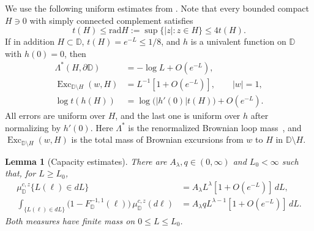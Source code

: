 \documentclass[11pt]{article}
\numberwithin{equation}{section}
\newcommand{\D}{\mathbb{D}}
\newcommand{\1}{\mathbf{1}}
\newtheorem{lemma}[theorem]{Lemma}
\newcommand{\rad}{\mathrm{rad}}
\begin{document}
We use the following uniform estimates from
\cite[Remark~2.8, Lemmas~2.10 and~2.12, and Proposition~3.3]{lawler-field-reversed}.  Note that every bounded compact \(H\ni0\) with simply connected complement satisfies
\begin{equation}\label{eq:one-arm-FL-radius}
 t(H)\le\rad H:=\sup\{|z|:z\in H\}\le4t(H).
\end{equation}
If in addition \(H\subset\D\), \(t(H)=e^{-L}\le1/8\), and \(h\) is a
univalent function on \(\D\) with \(h(0)=0\), then
\begin{align}
 \Lambda^*(H,\partial\D)&=-\log L+O(e^{-L}),
 \label{eq:one-arm-FL-loop}\\
 \operatorname{Exc}_{\D\setminus H}(w,H)
   &=L^{-1}[1+O(e^{-L})],\qquad |w|=1,
 \label{eq:one-arm-FL-exc}\\
 \log t(h(H))&=\log\bigl(|h'(0)|t(H)\bigr)+O(e^{-L}).
 \label{eq:one-arm-FL-map}
\end{align}
All errors are uniform over \(H\), and the last one is uniform over \(h\)
after normalizing by \(h'(0)\).  Here \(\Lambda^*\) is the renormalized Brownian loop mass~\cite{lawler-field-reversed}, and
\(\operatorname{Exc}_{\D\setminus H}(w,H)\) is the total mass of Brownian excursions
from \(w\) to \(H\) in $\D\setminus H$.

\begin{lemma}[Capacity estimates]\label{lem:one-arm-shells}
There are \(A_\lambda,q\in(0,\infty)\) and \(L_0<\infty\) such that, for
\(L\ge L_0\),
\begin{align}
 \mu_\D^{c,z}\{L(\ell)\in dL\}
   &=A_\lambda L^\lambda[1+O(e^{-L})]\,dL,
 \label{eq:one-arm-shell}\\
 \int_{\{L(\ell)\in dL\}}
   \bigl(1-F_\D^{-1,1}(\ell)\bigr)\,\mu_\D^{c,z}(d\ell)
   &=A_\lambda q L^{\lambda-1}[1+O(e^{-L})]\,dL.
 \label{eq:one-arm-defect-shell}
\end{align}
Both measures have finite mass on \(0\le L\le L_0\).
\end{lemma}
\end{document}
